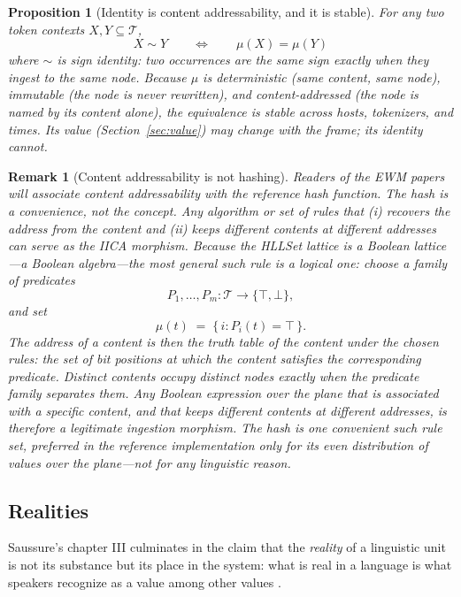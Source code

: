 \documentclass[11pt,a4paper]{article}
\newtheorem{proposition}[principle]{Proposition}
\newtheorem{remark}[principle]{Remark}
\theoremstyle{remark}
\newcommand{\Tok}{\ensuremath{\mathcal{T}}}              %
\newcommand{\Ing}{\ensuremath{\mu}}                      %
\begin{document}
\begin{proposition}[Identity is content addressability, and it is stable]
\label{prop:identity}
For any two token contexts $X, Y \subseteq \Tok$,
\[
  X \sim Y
  \qquad\Longleftrightarrow\qquad
  \Ing(X) = \Ing(Y)
\]
where $\sim$ is sign identity: two occurrences are the same sign exactly
when they ingest to the same node. Because $\Ing$ is deterministic (same
content, same node), immutable (the node is never rewritten), and
content-addressed (the node is named by its content alone), the
equivalence is stable across hosts, tokenizers, and times. Its
\emph{value} (Section~\ref{sec:value}) may change with the frame; its
identity cannot.
\end{proposition}

\begin{remark}[Content addressability is not hashing]
\label{rem:not-hashing}
Readers of the EWM papers will associate content addressability with the
reference hash function. The hash is a convenience, not the concept. Any
algorithm or set of rules that (i) recovers the address from the content and
(ii) keeps different contents at different addresses can serve as the IICA
morphism. Because the HLLSet lattice is a Boolean lattice---a Boolean
algebra---the most general such rule is a \emph{logical} one: choose a family
of predicates
\[
  P_1,\dots,P_m : \Tok \to \{\top,\bot\},
\]
and set
\[
  \Ing(t) \;=\; \{\, i : P_i(t) = \top \,\}.
\]
The address of a content is then the truth table of the content under the
chosen rules: the set of bit positions at which the content satisfies the
corresponding predicate. Distinct contents occupy distinct nodes exactly when
the predicate family separates them. Any Boolean expression over the plane
that is associated with a specific content, and that keeps different contents
at different addresses, is therefore a legitimate ingestion morphism. The
hash is one convenient such rule set, preferred in the reference
implementation only for its even distribution of values over the plane---not
for any linguistic reason.
\end{remark}

\subsection{Realities}
\label{sec:realities}

Saussure's chapter III culminates in the claim that the \emph{reality} of a
linguistic unit is not its substance but its place in the system: what is
real in a language is what speakers recognize as a value among other values
\cite[Part II, ch.~III]{harris1983}.
\end{document}
